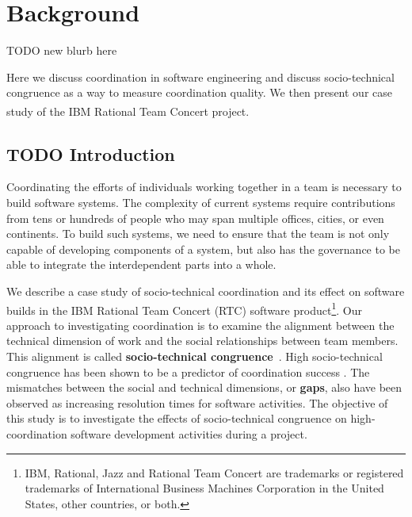 


\section{Background}
\label{sec:background}
TODO new blurb here

Here we discuss coordination in software engineering and discuss socio-technical congruence as a way to measure coordination quality. We then present our case study of the IBM Rational Team Concert\textsuperscript{\textregistered} project.

\subsection{TODO Introduction}
Coordinating the efforts of individuals working together in a team is
necessary to build software systems. The complexity of current systems require contributions
from tens or hundreds of people who may span multiple offices, cities, or even continents.
To build such systems, we need to ensure that the team is not only capable of
developing components of a system, but also has the governance to be able to integrate the
interdependent parts into a whole.

We describe a case study of socio-technical coordination and its effect on software builds in the IBM\textsuperscript{\textregistered}
Rational Team Concert\textsuperscript{\textregistered} (RTC) software product\footnote{IBM, Rational, Jazz and Rational Team Concert are trademarks or registered trademarks of International Business Machines Corporation in the United States, other countries, or both.}.
Our approach to investigating coordination is to examine the
alignment between the technical dimension of work and the social relationships
between team members. This alignment is called \textbf{socio-technical
congruence}~\cite{cataldo:cscw:2006}. High socio-technical congruence
has been shown to be a predictor of coordination success
\cite{cataldo:cscw:2006,ehrlich2008:gaps}.
The mismatches between the social and technical dimensions, or \textbf{gaps},
also have been observed as increasing resolution times for software activities.
The objective of this study is to investigate the effects of socio-technical congruence on high-coordination software development activities during a project.

